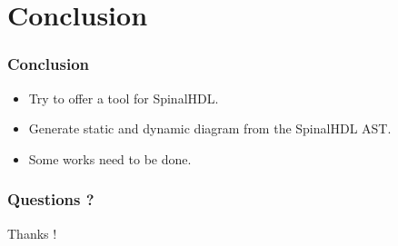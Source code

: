 \documentclass[11pt, handout]{beamer}
\begin{document}
\section{Conclusion}

\begin{frame}
  \frametitle{Conclusion}
  \begin{itemize}
  \item Try to offer a tool for SpinalHDL.
  \item Generate static and dynamic diagram from the SpinalHDL AST.
  \item Some works need to be done.
  \end{itemize}
\end{frame}

\begin{frame}
  \frametitle{Questions ?}
  \begin{tcolorbox}
  \begin{center}
    \Huge Thanks !
  \end{center}
  \end{tcolorbox}
\end{frame}
\end{document}
